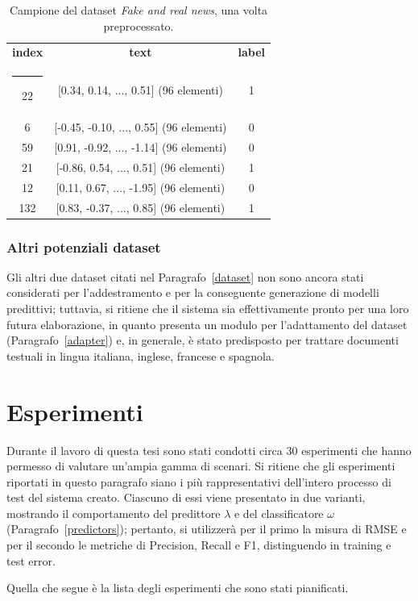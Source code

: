 \documentclass[12pt]{report}
\makeatletter
\theoremstyle{definition}
\newcommand{\thickhline}{%
    \noalign {\ifnum 0=`}\fi \hrule height 1pt
    \futurelet \reserved@a \@xhline
}
\makeatother
\begin{document}
\begin{table}
\centering
 \begin{tabular}{|c|c|c|} 
 \hline 
 \textbf{index} & \textbf{text} & \textbf{label}
\\ [0.5ex] 
 \thickhline
22 & [0.34, 0.14, ..., 0.51] (96 elementi) & 1 \\
6 & [-0.45, -0.10, ..., 0.55] (96 elementi) & 0 \\ 
59 & [0.91, -0.92, ..., -1.14] (96 elementi) & 0\\
21 & [-0.86, 0.54, ..., 0.51] (96 elementi) & 1\\
12 & [0.11, 0.67, ..., -1.95] (96 elementi) & 0\\
132 & [0.83, -0.37, ..., 0.85] (96 elementi) & 1\\
 \hline
\end{tabular}
\caption{Campione del dataset \textit{Fake and real news}, una volta preprocessato.}
\label{preprocesseddata}
\end{table}

\subsubsection{Altri potenziali dataset}
Gli altri due dataset citati nel Paragrafo~\ref{dataset} non sono ancora stati considerati per l'addestramento e per la conseguente generazione di modelli predittivi; tuttavia, si ritiene che il sistema sia effettivamente pronto per una loro futura elaborazione, in quanto presenta un modulo per l'adattamento del dataset (Paragrafo~\ref{adapter}) e, in generale, è stato predisposto per trattare documenti testuali in lingua italiana, inglese, francese e spagnola.

\section{Esperimenti}\label{esperimenti}
Durante il lavoro di questa tesi sono stati condotti circa 30 esperimenti che hanno permesso di valutare un'ampia gamma di scenari. Si ritiene che gli esperimenti riportati in questo paragrafo siano i più rappresentativi dell'intero processo di test del sistema creato. Ciascuno di essi viene presentato in due varianti, mostrando il comportamento del predittore $\lambda$ e del classificatore $\omega$ (Paragrafo~\ref{predictors}); pertanto, si utilizzerà per il primo la misura di RMSE e per il secondo le metriche di Precision, Recall e F1, distinguendo in training e test error. 

Quella che segue è la lista degli esperimenti che sono stati pianificati.
\end{document}
